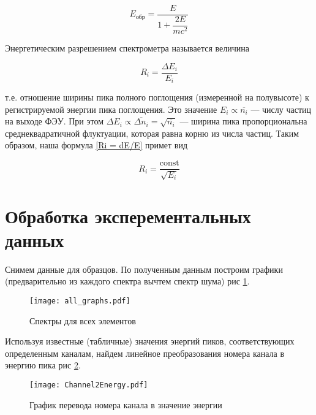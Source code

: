	\begin{equation}\label{Eobr}
		E_{обр} = \dfrac{E}{1 + \dfrac{2E}{mc^2}}
	\end{equation}

%	
	Энергетическим разрешением спектрометра называется величина
	
	\begin{equation}\label{Ri = dE/E}
	R_i = \dfrac{\Delta E_i}{E_i}
	\end{equation}
	
	т.е. отношение ширины пика полного поглощения (измеренной на полувысоте) к регистрируемой энергии пика поглощения. Это значение $ E_i \propto \overline{n_i} $ --- числу частиц на выходе ФЭУ. При этом  $ \Delta E_i \propto \overline{\Delta n_i} = \sqrt{\overline{n_i}} $ --- ширина пика пропорциональна среднеквадратичной флуктуации, которая равна корню из числа частиц. Таким образом, наша формула \eqref{Ri = dE/E} примет вид
	
	\begin{equation}\label{Ri = c/E}
	R_i = \dfrac{\mathrm{const}}{\sqrt{E_i}}
	\end{equation}

    \section*{Обработка эксперементальных данных}

	Снимем данные для образцов. По полученным данным построим графики (предварительно из каждого спектра
	вычтем спектр шума) рис \ref{fig:spectrum}.

	\begin{figure}
		\centering
		\texttt{[image: all\_graphs.pdf]}
		\caption{Спектры для всех элементов}
		\label{fig:spectrum}
	\end{figure}

	Используя известные (табличные) значения энергий пиков, соответствующих определенным каналам, найдем
	линейное преобразования номера канала в энергию пика рис \ref{fig:Channel2Energy}.

	\begin{figure}
		\centering
		\texttt{[image: Channel2Energy.pdf]}
		\caption{График перевода номера канала в значение энергии}
		\label{fig:Channel2Energy}
	\end{figure}

